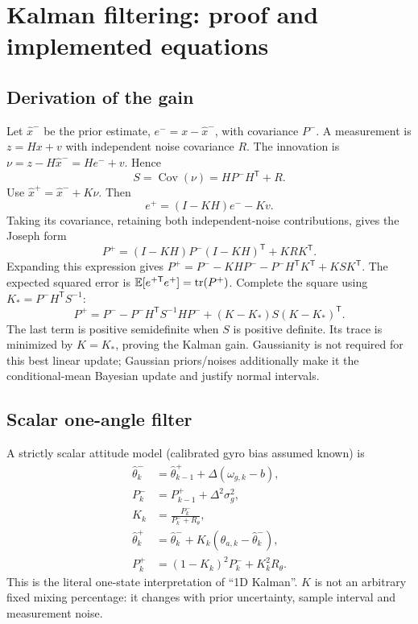 \chapter{Kalman filtering: proof and implemented equations}
\section{Derivation of the gain}
Let $\hat x^-$ be the prior estimate, $e^-=x-\hat x^-$, with covariance
$P^-$. A measurement is $z=Hx+v$ with independent noise covariance $R$.
The innovation is $\nu=z-H\hat x^-=He^-+v$. Hence
\begin{equation}S=\operatorname{Cov}(\nu)=HP^-H^{\mathsf T}+R.\end{equation}
Use $\hat x^+=\hat x^-+K\nu$. Then
\begin{equation}
e^+=(I-KH)e^- - Kv.
\end{equation}
Taking its covariance, retaining both independent-noise contributions, gives
the Joseph form
\begin{equation}\label{eq:joseph}
P^+=(I-KH)P^-(I-KH)^{\mathsf T}+KRK^{\mathsf T}.
\end{equation}
Expanding this expression gives
$P^+=P^- -KHP^- -P^-H^{\mathsf T}K^{\mathsf T}+KSK^{\mathsf T}$.
The expected squared error is $\mathbb{E}[e^{+\mathsf T}e^+]=\operatorname{tr}(P^+)$.
Complete the square using $K_*=P^-H^{\mathsf T}S^{-1}$:
\begin{equation}
P^+=P^- -P^-H^{\mathsf T}S^{-1}HP^-
 +(K-K_*)S(K-K_*)^{\mathsf T}.
\end{equation}
The last term is positive semidefinite when $S$ is positive definite. Its
trace is minimized by $K=K_*$, proving the Kalman gain. Gaussianity is not
required for this best linear update; Gaussian priors/noises additionally
make it the conditional-mean Bayesian update and justify normal intervals.

\section{Scalar one-angle filter}
A strictly scalar attitude model (calibrated gyro bias assumed known) is
\begin{align}
\hat\theta^-_k&=\hat\theta^+_{k-1}+\Delta(\omega_{g,k}-b),\\
P^-_k&=P^+_{k-1}+\Delta^2\sigma_g^2,\\
K_k&=\frac{P^-_k}{P^-_k+R_\theta},\\
\hat\theta^+_k&=\hat\theta^-_k+K_k(\theta_{a,k}-\hat\theta^-_k),\\
P^+_k&=(1-K_k)^2P^-_k+K_k^2R_\theta.
\end{align}
This is the literal one-state interpretation of ``1D Kalman''. $K$ is not
an arbitrary fixed mixing percentage: it changes with prior uncertainty,
sample interval and measurement noise.

